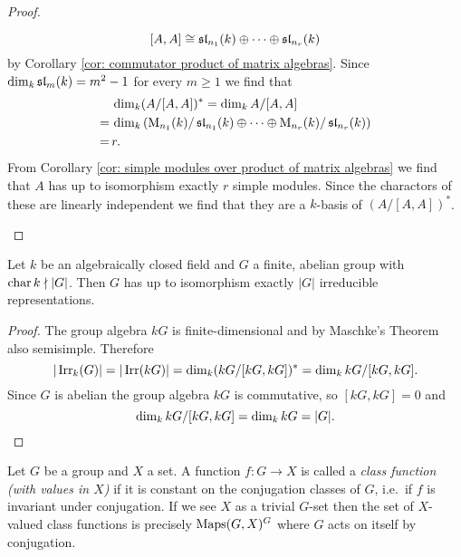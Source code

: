 \begin{proof}
\begin{enumerate}[label=\emph{\alph*)},leftmargin=*]
      \[
        [A,A] \cong \operatorname{\mathfrak{sl}}_{n_1}(k) \oplus \dotsb \oplus \operatorname{\mathfrak{sl}}_{n_r}(k)
      \]
      by Corollary \ref{cor: commutator product of matrix algebras}. Since $\dim_k \operatorname{\mathfrak{sl}}_m(k) = m^2 - 1$ for every $m \geq 1$ we find that
      \begin{align*}
          &\, \dim_k (A/[A,A])^*
        =    \dim_k A/[A,A] \\
        =&\, \dim_k\left( \operatorname{M}_{n_1}(k)/\operatorname{\mathfrak{sl}}_{n_1}(k) \oplus \dotsb \oplus \operatorname{M}_{n_r}(k)/\operatorname{\mathfrak{sl}}_{n_r}(k) \right) \\
        =&\, r.
      \end{align*}
      From Corollary \ref{cor: simple modules over product of matrix algebras} we find that $A$ has up to isomorphism exactly $r$ simple modules. Since the charactors of these are linearly independent we find that they are a $k$-basis of $(A/[A,A])^*$.
    \qedhere
  \end{enumerate}
\end{proof}


\begin{cor}\label{cor: number of irreducible representations of finite abelian group}
  Let $k$ be an algebraically closed field and $G$ a finite, abelian group with $\operatorname{char} k \nmid |G|$. Then $G$ has up to isomorphism exactly $|G|$ irreducible representations.
\end{cor}
\begin{proof}
  The group algebra $kG$ is finite-dimensional and by Maschke’s Theorem also semisimple. Therefore
  \[
    |\operatorname{Irr}_k(G)| = |\operatorname{Irr}(kG)| = \dim_k (kG/[kG, kG])^* = \dim_k kG/[kG, kG].
  \]
  Since $G$ is abelian the group algebra $kG$ is commutative, so $[kG,kG] = 0$ and
  \[
    \dim_k kG/[kG, kG] = \dim_k kG = |G|.
    \qedhere
  \]
\end{proof}


\begin{defi}
  Let $G$ be a group and $X$ a set. A function $f \colon G \to X$ is called a \emph{class function (with values in $X$)} if it is constant on the conjugation classes of $G$, i.e.\ if $f$ is invariant under conjugation. If we see $X$ as a trivial $G$-set then the set of $X$-valued class functions is precisely $\operatorname{Maps}(G,X)^G$ where $G$ acts on itself by conjugation.
\end{defi}


